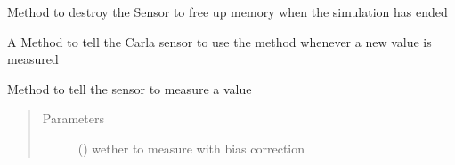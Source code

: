 \documentclass[letterpaper,10pt,english]{sphinxmanual}
\begin{document}
\begin{fulllineitems}
\begin{fulllineitems}
\begin{quote}
\begin{description}
\end{description}\end{quote}

\end{fulllineitems}


\begin{fulllineitems}
\label{\detokenize{sim_interfaces:lib.sim_interfaces.SimSensor.destroy}}
Method to destroy the Sensor to free up memory when the simulation has ended

\end{fulllineitems}


\begin{fulllineitems}
\label{\detokenize{sim_interfaces:lib.sim_interfaces.SimSensor.listen}}
A Method to tell the Carla sensor to use the {\hyperref[\detokenize{sim_interfaces:lib.sim_interfaces.SimSensor.callback}]{}} method whenever a new
value is measured

\end{fulllineitems}


\begin{fulllineitems}
\label{\detokenize{sim_interfaces:lib.sim_interfaces.SimSensor.measure}}
Method to tell the sensor to measure a value
\begin{quote}\begin{description}
\item[{Parameters}] \leavevmode
{} () \textendash{} wether to measure with bias correction

\end{description}\end{quote}


\end{fulllineitems}
\end{fulllineitems}
\end{document}
